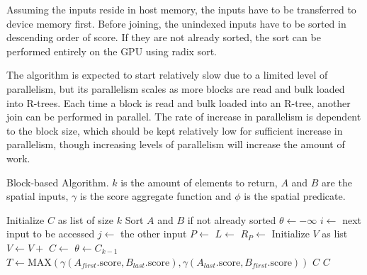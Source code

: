 Assuming the inputs reside in host memory, the inputs have to be transferred to device memory first. Before joining, the unindexed inputs have to be sorted in descending order of score. If they are not already sorted, the sort can be performed entirely on the GPU using radix sort.

The algorithm is expected to start relatively slow due to a limited level of parallelism, but its parallelism scales as more blocks are read and bulk loaded into R-trees. Each time a block is read and bulk loaded into an R-tree, another join can be performed in parallel. The rate of increase in parallelism is dependent to the block size, which should be kept relatively low for sufficient increase in parallelism, though increasing levels of parallelism will increase the amount of work.

\begin{algorithm}
  \caption{Block-based Algorithm. \(k\) is the amount of elements to return, \(A\) and \(B\) are the spatial inputs, \(\gamma\) is the score aggregate function and \(\phi\) is the spatial predicate.}
  \label{alg/block-based}
  \begin{algorithmic}[1]
      \State Initialize \(C\) as list of size \(k\)
      \State Sort \(A\) and \(B\) if not already sorted
      \State \(\theta \gets -\infty\)
        \State \(i \gets\) next input to be accessed 
        \State \(j \gets\) the other input 
        \State \(P \gets\) 
        \State \(L \gets\) 
        \State \(R_P \gets\) 
        \State Initialize \(V\) as list
          \State \(V \gets V +\) 
        \EndFor
        \State \(C \gets\) 
          \State \(\theta \gets C_{k - 1}\)
        \EndIf
        \State \(T \gets \mathrm{MAX}(\gamma(A_{first}.\mathrm{score}, B_{last}.\mathrm{score}), \gamma(A_{last}.\mathrm{score}, B_{first}.\mathrm{score}))\)
          \State \Return \(C\) 
        \EndIf
      \EndWhile
      \State \Return \(C\) 
    \EndFunction
  \end{algorithmic}
\end{algorithm}
